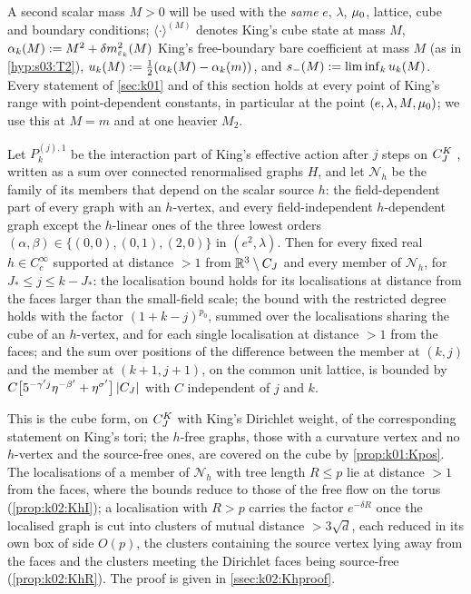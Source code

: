 A second scalar mass $M>0$ will be used with the \emph{same} $e$, $\lambda$, $\mu_0$, lattice, cube and boundary conditions; $\langle\cdot\rangle^{(M)}$ denotes King's cube state at mass $M$, $\alpha_k(M):= M^2+\delta m^2_{\varepsilon_k}(M)$ King's free-boundary bare coefficient at mass $M$ (as in \cref{hyp:s03:T2}), $u_k(M):=\frac12(\alpha_k(M)-\alpha_k(m))$, and $s_-(M):=\liminf_ku_k(M)$. Every statement of \cref{sec:k01} and of this section holds at every point of King's range with point-dependent constants, in particular at the point $(e,\lambda,M,\mu_0)$; we use this at $M=m$ and at one heavier $M_2$.

\begin{lemma}\label{hyp:k02:Kh}
Let $P^{(j),1}_k$ be the interaction part of King's effective action after $j$ steps on $C^{K}_{J}$ \cite[(3.17)]{K1}, written as a sum over connected renormalised graphs $H$, and let $\mathcal N_h$ be the family of its members that depend on the scalar source $h$: the field-dependent part of every graph with an $h$-vertex, and every field-independent $h$-dependent graph except the $h$-linear ones of the three lowest orders $(\alpha,\beta)\in\{(0,0),(0,1),(2,0)\}$ in $(e^2,\lambda)$. Then for every fixed real $h\in C^\infty_c$ supported at distance $>1$ from $\mathbb R^3\setminus C_J$ and every member of $\mathcal N_h$, for $J_*\le j\le k-J_*$: the localisation bound \cite[(3.39)]{K1} holds for its localisations at distance from the faces larger than the small-field scale; the bound \cite[(3.38)]{K1} with the restricted degree holds with the factor $(1+k-j)^{p_0}$, summed over the localisations sharing the cube of an $h$-vertex, and for each single localisation at distance $>1$ from the faces; and the sum over positions of the difference between the member at $(k,j)$ and the member at $(k+1,j+1)$, on the common unit lattice, is bounded by $C\big[5^{-\gamma'j}\eta^{-\beta'}+\eta^{\sigma'}\big]\,|C_J|$ with $C$ independent of $j$ and $k$.
\end{lemma}
This is the cube form, on $C^{K}_{J}$ with King's Dirichlet weight, of the corresponding statement on King's tori; the $h$-free graphs, those with a curvature vertex and no $h$-vertex and the source-free ones, are covered on the cube by \cref{prop:k01:Kpos}. The localisations of a member of $\mathcal N_h$ with tree length $R\le p$ lie at distance $>1$ from the faces, where the bounds reduce to those of the free flow on the torus (\cref{prop:k02:KhI}); a localisation with $R>p$ carries the factor $e^{-\delta R}$ once the localised graph is cut into clusters of mutual distance $>3\sqrt d$, each reduced in its own box of side $O(p)$, the clusters containing the source vertex lying away from the faces and the clusters meeting the Dirichlet faces being source-free (\cref{prop:k02:KhR}). The proof is given in \cref{ssec:k02:Khproof}.


